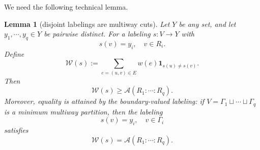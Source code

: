 \documentclass[11pt,oneside,letterpaper]{article}
\numberwithin{equation}{section}
\newtheorem{lemma}[theorem]{Lemma}
\theoremstyle{definition}
\theoremstyle{remark}
\begin{document}
We need the following technical lemma.
\begin{lemma}[disjoint labelings are multiway cuts]
  \label{lem:labeling}
  Let $Y$ be any set, and let $y_1,\cdots,y_q\in Y$ be pairwise distinct. For a labeling $s:V\to Y$ with
  \begin{equation}
    s(v) = y_i,\quad v\in R_i.
  \end{equation}
  Define
  \begin{equation}
    \mathcal{W}(s) := \sum_{e=(u,v)\in E} w(e) \mathbf{1}_{s(u)\ne s(v)}.
  \end{equation}
  Then
  \begin{equation}
    \label{eq:labeling_ineq}
    \mathcal{W}(s) \ge \mathcal{A}(R_1:\cdots:R_q).
  \end{equation}
  Moreover, equality is attained by the boundary-valued labeling: if $V=\Gamma_1\sqcup\cdots\sqcup \Gamma_q$ is a minimum multiway partition, then the labeling
  \begin{equation}
    \label{eq:labeling_part}
    s(v) = y_i,\quad v\in \Gamma_i
  \end{equation}
  satisfies
  \begin{equation}
    \mathcal{W}(s) = \mathcal{A}(R_1:\cdots:R_q).
  \end{equation}
\end{lemma}
\end{document}

